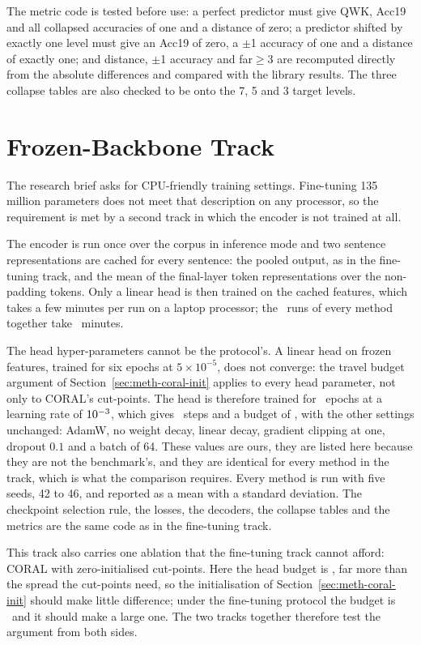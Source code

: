 The metric code is tested before use: a perfect predictor must give QWK, Acc19 and all
collapsed accuracies of one and a distance of zero; a predictor shifted by exactly one level
must give an Acc19 of zero, a $\pm$1 accuracy of one and a distance of exactly one; and
distance, $\pm$1 accuracy and far$\geq$3 are recomputed directly from the absolute differences
and compared with the library results. The three collapse tables are also checked to be onto
the 7, 5 and 3 target levels.

\section{Frozen-Backbone Track}
\label{sec:meth-frozen}

The research brief asks for CPU-friendly training settings. Fine-tuning 135 million parameters
does not meet that description on any processor, so the requirement is met by a second track in
which the encoder is not trained at all.

The encoder is run once over the corpus in inference mode and two sentence representations are
cached for every sentence: the pooled output, as in the fine-tuning track, and the mean of the
final-layer token representations over the non-padding tokens. Only a linear head is then
trained on the cached features, which takes a few minutes per run on a laptop processor; the
\cpuSeeds\ runs of every method together take \cpuTotalMinutes\ minutes.

The head hyper-parameters cannot be the protocol's. A linear head on frozen features, trained
for six epochs at $5\times10^{-5}$, does not converge: the travel budget argument of
Section~\ref{sec:meth-coral-init} applies to every head parameter, not only to CORAL's
cut-points. The head is therefore trained for \cpuEpochs\ epochs at a learning rate of
$10^{-3}$, which gives \cpuTotalSteps\ steps and a budget of \cpuLrSum, with the other
settings unchanged: AdamW, no weight decay, linear decay, gradient clipping at one, dropout
$0.1$ and a batch of 64. These values are ours, they are listed here because they are not the
benchmark's, and they are identical for every method in the track, which is what the comparison
requires. Every method is run with five seeds, 42 to 46, and reported as a mean with a standard
deviation. The checkpoint selection rule, the losses, the decoders, the collapse tables and the
metrics are the same code as in the fine-tuning track.

This track also carries one ablation that the fine-tuning track cannot afford: CORAL with
zero-initialised cut-points. Here the head budget is \cpuLrSum, far more than the spread the
cut-points need, so the initialisation of Section~\ref{sec:meth-coral-init} should make little
difference; under the fine-tuning protocol the budget is \lrSumEncoder\ and it should make a
large one. The two tracks together therefore test the argument from both sides.

